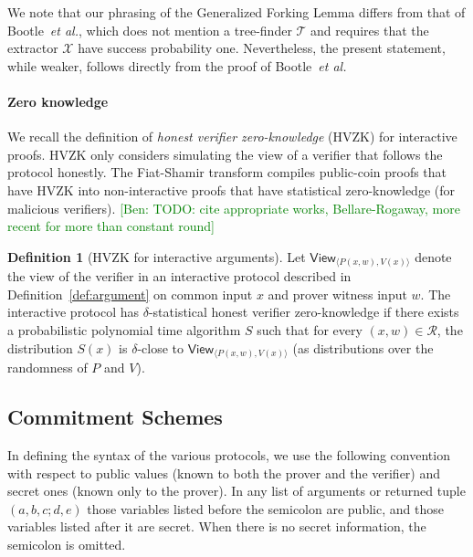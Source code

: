 \documentclass{article}
\theoremstyle{definition}
\newtheorem{definition}{Definition}
\newcommand{\ben}[1]{{\textcolor{green}{[Ben: #1]}}}
\newcommand{\ben}[1]{}
\begin{document}
We note that our phrasing of the Generalized Forking Lemma differs from that of Bootle~\emph{et al.}, which does not mention a tree-finder $\mathcal{T}$ and requires that the extractor $\mathcal{X}$ have success probability one. Nevertheless, the present statement, while weaker, follows directly from the proof of Bootle~\emph{et al.}

\paragraph{Zero knowledge} We recall the definition of \emph{honest verifier zero-knowledge} (HVZK) for interactive proofs. HVZK only considers simulating the view of a verifier that follows the protocol honestly. The Fiat-Shamir transform compiles public-coin proofs that have HVZK into non-interactive proofs that have statistical zero-knowledge (for malicious verifiers). \ben{TODO: cite appropriate works, Bellare-Rogaway, more recent for more than constant round} 

\begin{definition}[HVZK for interactive arguments]
Let $\textsf{View}_{\langle P(x, w), V(x) \rangle}$ denote the view of the verifier in an interactive protocol described in Definition~\ref{def:argument} on common input $x$ and prover witness input $w$. The interactive protocol has $\delta$-statistical honest verifier zero-knowledge if there exists a probabilistic polynomial time algorithm $S$ such that for every $(x, w) \in \mathcal{R}$, the distribution $S(x)$ is $\delta$-close to $\textsf{View}_{\langle P(x, w), V(x) \rangle}$ (as distributions over the randomness of $P$ and $V$).
\end{definition}

\subsection{Commitment Schemes}

In defining the syntax of the various protocols, we use the following convention with respect to public values (known to both the prover and the verifier) and secret ones (known only to the prover). In any list of arguments or returned tuple $(a, b, c; d, e)$ those variables listed before the semicolon are public, and those variables listed after it are secret. When there is no secret information, the semicolon is omitted.
\end{document}
